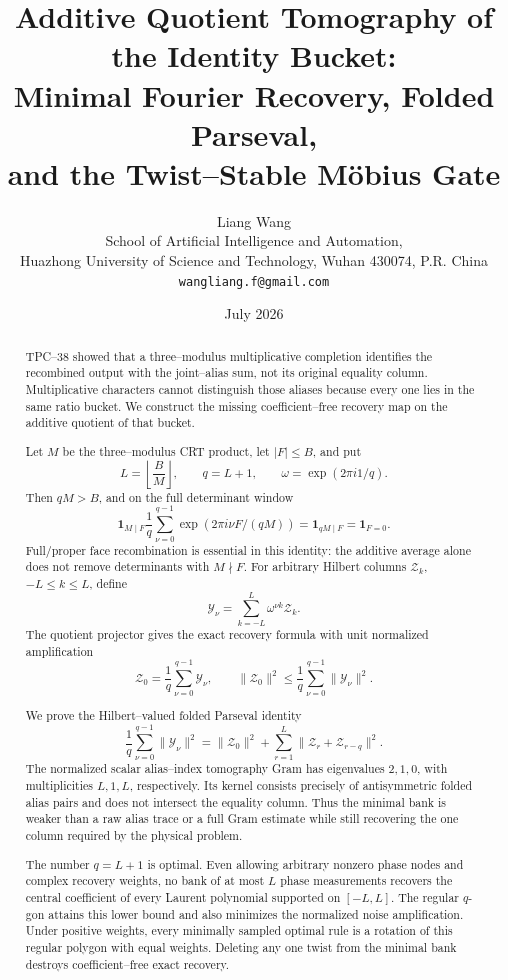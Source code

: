 \documentclass[11pt]{article}
\title{\textbf{Additive Quotient Tomography of the Identity Bucket:}\\
\textbf{Minimal Fourier Recovery, Folded Parseval,}\\
\textbf{and the Twist--Stable M\"obius Gate}}
\author{Liang Wang\\
\small School of Artificial Intelligence and Automation,\\[-0.2em]
\small Huazhong University of Science and Technology, Wuhan 430074, P.R. China\\
\small \texttt{wangliang.f@gmail.com}}
\date{July 2026}
\theoremstyle{definition}
\theoremstyle{remark}
\newcommand{\one}{\mathbf 1}
\newcommand{\ee}[1]{\exp(2\pi i #1)}
\begin{document}
\maketitle

\begin{abstract}
TPC--38 showed that a three--modulus multiplicative completion identifies
the recombined output with the joint--alias sum, not its original equality
column.  Multiplicative
characters cannot distinguish those aliases because every one lies in the
same ratio bucket.  We construct the missing coefficient--free recovery
map on the additive quotient of that bucket.

Let \(M\) be the three--modulus CRT product, let \(|F|\le B\), and put
\[
 L=\left\lfloor\frac BM\right\rfloor,
 \qquad q=L+1,
 \qquad \omega=\ee{1/q}.
\]
Then \(qM>B\), and on the full determinant window
\[
 \one_{M\mid F}\frac1q\sum_{\nu=0}^{q-1}
 \ee{\nu F/(qM)}
 =\one_{qM\mid F}
 =\one_{F=0}.
\]
Full/proper face recombination is essential in this identity: the additive
average alone does not remove determinants with \(M\nmid F\).  For arbitrary
Hilbert columns \(\mathscr Z_k\), \(-L\le k\le L\), define
\[
 \mathscr Y_\nu=\sum_{k=-L}^{L}\omega^{\nu k}\mathscr Z_k.
\]
The quotient projector gives the exact recovery formula with unit normalized
amplification
\[
 \mathscr Z_0=\frac1q\sum_{\nu=0}^{q-1}\mathscr Y_\nu,
 \qquad
 \|\mathscr Z_0\|^2\le
 \frac1q\sum_{\nu=0}^{q-1}\|\mathscr Y_\nu\|^2.
\]

We prove the Hilbert--valued folded Parseval identity
\[
 \frac1q\sum_{\nu=0}^{q-1}\|\mathscr Y_\nu\|^2
 =\|\mathscr Z_0\|^2+
 \sum_{r=1}^{L}\|\mathscr Z_r+\mathscr Z_{r-q}\|^2.
\]
The normalized scalar alias--index tomography Gram has eigenvalues \(2,1,0\), with
multiplicities \(L,1,L\), respectively.  Its kernel consists precisely of
antisymmetric folded alias pairs and does not intersect the equality
column.  Thus the minimal bank is weaker than a raw alias trace or a full
Gram estimate while still recovering the one column required by the
physical problem.

The number \(q=L+1\) is optimal.  Even allowing arbitrary nonzero phase
nodes and complex recovery weights, no bank of at most \(L\) phase
measurements recovers the central coefficient of every Laurent polynomial
supported on \([-L,L]\).  The regular \(q\)-gon attains this lower bound and
also minimizes the normalized noise amplification.  Under positive
weights, every minimally sampled optimal rule is a rotation of this
regular polygon with equal weights.  Deleting any one twist from the
minimal bank destroys coefficient--free exact recovery.


\end{abstract}
\end{document}
